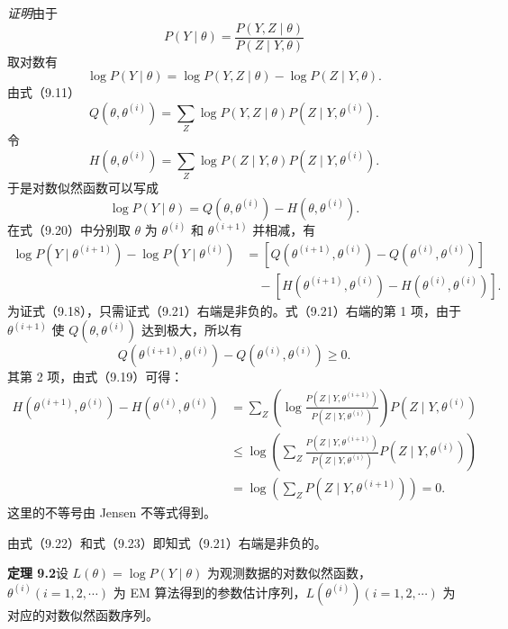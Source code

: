 \documentclass[UTF8,12pt,a4paper,fontset=fandol]{ctexart}
\begin{document}
\noindent\textit{证明}\quad 由于
\[
  P(Y\mid\theta)=\frac{P(Y,Z\mid\theta)}{P(Z\mid Y,\theta)}
\]
取对数有
\[
  \log P(Y\mid\theta)=\log P(Y,Z\mid\theta)-\log P(Z\mid Y,\theta).
\]
由式（9.11）
\[
  Q(\theta,\theta^{(i)})=\sum_Z \log P(Y,Z\mid\theta)P(Z\mid Y,\theta^{(i)}).
\]
令
\begin{equation}
  H(\theta,\theta^{(i)})=\sum_Z \log P(Z\mid Y,\theta)P(Z\mid Y,\theta^{(i)}).
  \tag{9.19}
\end{equation}
于是对数似然函数可以写成
\begin{equation}
  \log P(Y\mid\theta)=Q(\theta,\theta^{(i)})-H(\theta,\theta^{(i)}).
  \tag{9.20}
\end{equation}
在式（9.20）中分别取 $\theta$ 为 $\theta^{(i)}$ 和 $\theta^{(i+1)}$ 并相减，有
\begin{equation}
\begin{aligned}
  \log P(Y\mid\theta^{(i+1)})-\log P(Y\mid\theta^{(i)})
  &=[Q(\theta^{(i+1)},\theta^{(i)})-Q(\theta^{(i)},\theta^{(i)})]\\
  &\quad-[H(\theta^{(i+1)},\theta^{(i)})-H(\theta^{(i)},\theta^{(i)})].
\end{aligned}
  \tag{9.21}
\end{equation}
为证式（9.18），只需证式（9.21）右端是非负的。式（9.21）右端的第 1 项，由于 $\theta^{(i+1)}$ 使 $Q(\theta,\theta^{(i)})$ 达到极大，所以有
\begin{equation}
  Q(\theta^{(i+1)},\theta^{(i)})-Q(\theta^{(i)},\theta^{(i)})\geq0.
  \tag{9.22}
\end{equation}
其第 2 项，由式（9.19）可得：
\begin{equation}
\begin{aligned}
  H(\theta^{(i+1)},\theta^{(i)})-H(\theta^{(i)},\theta^{(i)})
  &=\sum_Z \left(\log\frac{P(Z\mid Y,\theta^{(i+1)})}
  {P(Z\mid Y,\theta^{(i)})}\right)P(Z\mid Y,\theta^{(i)})\\
  &\leq \log\left(\sum_Z
  \frac{P(Z\mid Y,\theta^{(i+1)})}{P(Z\mid Y,\theta^{(i)})}
  P(Z\mid Y,\theta^{(i)})\right)\\
  &=\log\left(\sum_Z P(Z\mid Y,\theta^{(i+1)})\right)=0.
\end{aligned}
  \tag{9.23}
\end{equation}
这里的不等号由 Jensen 不等式得到。

由式（9.22）和式（9.23）即知式（9.21）右端是非负的。

\noindent\textbf{定理 9.2}\quad 设 $L(\theta)=\log P(Y\mid\theta)$ 为观测数据的对数似然函数，$\theta^{(i)}(i=1,2,\cdots)$ 为 EM 算法得到的参数估计序列，$L(\theta^{(i)})(i=1,2,\cdots)$ 为对应的对数似然函数序列。
\end{document}

